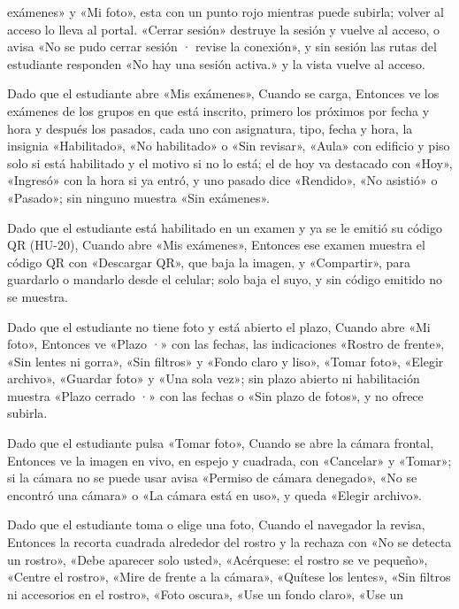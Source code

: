 {      exámenes» y «Mi foto», esta con un punto rojo mientras puede subirla; volver al
      acceso lo lleva al portal. «Cerrar sesión» destruye la sesión y vuelve al acceso,
      o avisa «No se pudo cerrar sesión · revise la conexión», y sin sesión las rutas
      del estudiante responden «No hay una sesión activa.» y la vista vuelve al acceso.
\item Dado que el estudiante abre «Mis exámenes», Cuando se carga, Entonces ve los
      exámenes de los grupos en que está inscrito, primero los próximos por fecha y hora
      y después los pasados, cada uno con asignatura, tipo, fecha y hora, la insignia
      «Habilitado», «No habilitado» o «Sin revisar», «Aula» con edificio y piso solo si
      está habilitado y el motivo si no lo está; el de hoy va destacado con «Hoy»,
      «Ingresó» con la hora si ya entró, y uno pasado dice «Rendido», «No asistió» o
      «Pasado»; sin ninguno muestra «Sin exámenes».
\item Dado que el estudiante está habilitado en un examen y ya se le emitió su código
      QR (HU-20), Cuando abre «Mis exámenes», Entonces ese examen muestra el código QR
      con «Descargar QR», que baja la imagen, y «Compartir», para guardarlo o mandarlo
      desde el celular; solo baja el suyo, y sin código emitido no se muestra.
\item Dado que el estudiante no tiene foto y está abierto el plazo, Cuando abre «Mi
      foto», Entonces ve «Plazo ·» con las fechas, las indicaciones «Rostro de frente»,
      «Sin lentes ni gorra», «Sin filtros» y «Fondo claro y liso», «Tomar foto», «Elegir archivo», «Guardar
      foto» y «Una sola vez»; sin plazo abierto ni habilitación muestra «Plazo cerrado ·»
      con las fechas o «Sin plazo de fotos», y no ofrece subirla.
\item Dado que el estudiante pulsa «Tomar foto», Cuando se abre la cámara frontal,
      Entonces ve la imagen en vivo, en espejo y cuadrada, con «Cancelar» y «Tomar»; si
      la cámara no se puede usar avisa «Permiso de cámara denegado», «No se encontró una
      cámara» o «La cámara está en uso», y queda «Elegir archivo».
\item Dado que el estudiante toma o elige una foto, Cuando el navegador la revisa,
      Entonces la recorta cuadrada alrededor del rostro y la rechaza con «No se detecta
      un rostro», «Debe aparecer solo usted», «Acérquese: el rostro se ve pequeño»,
      «Centre el rostro», «Mire de frente a la cámara», «Quítese los lentes», «Sin
      filtros ni accesorios en el rostro», «Foto oscura», «Use un fondo claro», «Use un
}
